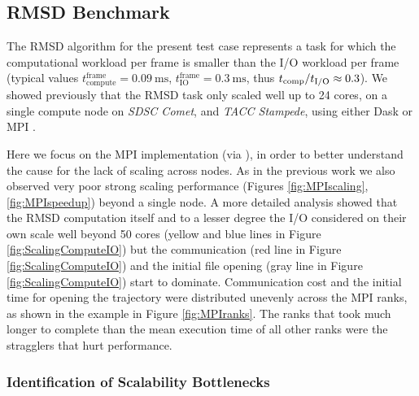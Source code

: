 \label{impl_exp}

\subsection{RMSD Benchmark}
\label{sec:RMSD}
The RMSD algorithm for the present test case represents a task for which the computational workload per frame is smaller than the I/O workload per frame (typical values $t_{\text{compute}}^{\text{frame}} = 0.09\ \text{ms}$, $t_{\text{IO}}^{\text{frame}} = 0.3\ \text{ms}$, thus ${t}_{\text{comp}}/{t}_{\text{I/O}} \approx 0.3$). 
We showed previously that the RMSD task only scaled well up to 24 cores, on a single compute node on \emph{SDSC Comet}, and \emph{TACC Stampede}, using either Dask or MPI \cite{Khoshlessan:2017ab}.

Here we focus on the MPI implementation (via  \cite{Dalcin:2011aa, Dalcin:2005aa}), in order to better understand the cause for the lack of scaling across nodes.
As in the previous work we also observed very poor strong scaling performance (Figures \ref{fig:MPIscaling}, \ref{fig:MPIspeedup}) beyond a single node.
A more detailed analysis showed that the RMSD computation itself and to a lesser degree the I/O considered on their own scale well beyond 50 cores (yellow and blue lines in Figure \ref{fig:ScalingComputeIO}) but the communication (red line in Figure \ref{fig:ScalingComputeIO}) and the initial file opening (gray line in Figure \ref{fig:ScalingComputeIO}) start to dominate.
Communication cost and the initial time for opening the trajectory were distributed unevenly across the MPI ranks, as shown in the example in Figure \ref{fig:MPIranks}. The ranks that took much longer to complete than the mean execution time of all other ranks were the stragglers that hurt performance.

\subsubsection*{Identification of Scalability Bottlenecks}

